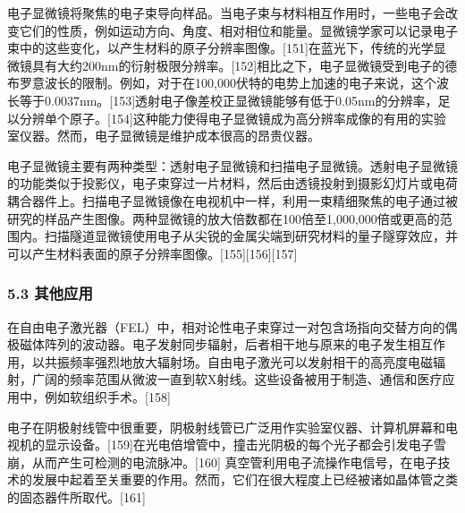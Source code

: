 电子显微镜将聚焦的电子束导向样品。当电子束与材料相互作用时，一些电子会改变它们的性质，例如运动方向、角度、相对相位和能量。显微镜学家可以记录电子束中的这些变化，以产生材料的原子分辨率图像。[151]在蓝光下，传统的光学显微镜具有大约200nm的衍射极限分辨率。[152]相比之下，电子显微镜受到电子的德布罗意波长的限制。例如，对于在100,000伏特的电势上加速的电子来说，这个波长等于0.0037nm。[153]透射电子像差校正显微镜能够有低于0.05nm的分辨率，足以分辨单个原子。[154]这种能力使得电子显微镜成为高分辨率成像的有用的实验室仪器。然而，电子显微镜是维护成本很高的昂贵仪器。

电子显微镜主要有两种类型：透射电子显微镜和扫描电子显微镜。透射电子显微镜的功能类似于投影仪，电子束穿过一片材料，然后由透镜投射到摄影幻灯片或电荷耦合器件上。扫描电子显微镜像在电视机中一样，利用一束精细聚焦的电子通过被研究的样品产生图像。两种显微镜的放大倍数都在100倍至1,000,000倍或更高的范围内。扫描隧道显微镜使用电子从尖锐的金属尖端到研究材料的量子隧穿效应，并可以产生材料表面的原子分辨率图像。[155][156][157]
\subsubsection{5.3 其他应用}
在自由电子激光器（FEL）中，相对论性电子束穿过一对包含场指向交替方向的偶极磁体阵列的波动器。电子发射同步辐射，后者相干地与原来的电子发生相互作用，以共振频率强烈地放大辐射场。自由电子激光可以发射相干的高亮度电磁辐射，广阔的频率范围从微波一直到软X射线。这些设备被用于制造、通信和医疗应用中，例如软组织手术。[158]

电子在阴极射线管中很重要，阴极射线管已广泛用作实验室仪器、计算机屏幕和电视机的显示设备。[159]在光电倍增管中，撞击光阴极的每个光子都会引发电子雪崩，从而产生可检测的电流脉冲。[160] 真空管利用电子流操作电信号，在电子技术的发展中起着至关重要的作用。然而，它们在很大程度上已经被诸如晶体管之类的固态器件所取代。[161]

